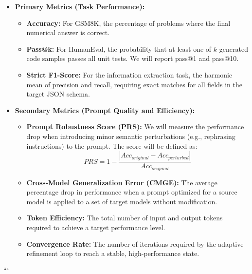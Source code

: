 \documentclass{article}
\begin{document}
\begin{itemize}
    \item \textbf{Primary Metrics (Task Performance):}
    \begin{itemize}
        \item \textbf{Accuracy:} For GSM8K, the percentage of problems where the final numerical answer is correct.
        \item \textbf{Pass@k:} For HumanEval, the probability that at least one of $k$ generated code samples passes all unit tests. We will report pass@1 and pass@10.
        \item \textbf{Strict F1-Score:} For the information extraction task, the harmonic mean of precision and recall, requiring exact matches for all fields in the target JSON schema.
    \end{itemize}

    \item \textbf{Secondary Metrics (Prompt Quality and Efficiency):}
    \begin{itemize}
        \item \textbf{Prompt Robustness Score (PRS):} We will measure the performance drop when introducing minor semantic perturbations (e.g., rephrasing instructions) to the prompt. The score will be defined as:
        \begin{equation}
            PRS = 1 - \frac{|Acc_{original} - Acc_{perturbed}|}{Acc_{original}}
        \end{equation}
        \item \textbf{Cross-Model Generalization Error (CMGE):} The average percentage drop in performance when a prompt optimized for a source model is applied to a set of target models without modification.
        \item \textbf{Token Efficiency:} The total number of input and output tokens required to achieve a target performance level.
        \item \textbf{Convergence Rate:} The number of iterations required by the adaptive refinement loop to reach a stable, high-performance state.
    \end{itemize}
\end{itemize}
```
\end{document}
